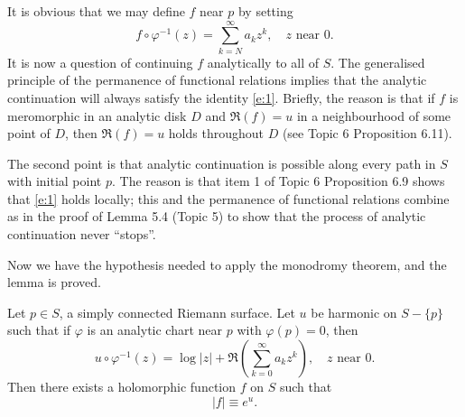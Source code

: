 \documentclass[a4paper,11pt]{article}
\begin{document}
\begin{myproof}
  It is obvious that we may define $f$ near $p$ by setting
  $$
  f \circ \varphi^{-1}(z) = \sum_{k=N}^{\infty} a_k z^k,\quad
  z \text{ near } 0.
  $$
  It is now a question of continuing $f$ analytically to all of $S$.
  The generalised principle of the permanence of functional relations
  implies that the analytic continuation will always satisfy the
  identity \eqref{e:1}.  Briefly, the reason is that if $f$ is
  meromorphic in an analytic disk $D$ and $\Re(f) = u$ in a
  neighbourhood of some point of $D$, then $\Re(f) = u$ holds
  throughout $D$ (see Topic 6 Proposition 6.11).

  The second point is that analytic continuation is possible along
  every path in $S$ with initial point $p$.  The reason is that
  item 1 of Topic 6 Proposition 6.9 shows that \eqref{e:1} holds
  locally; this and the permanence of functional relations combine as
  in the proof of Lemma 5.4 (Topic 5) to show that the process of
  analytic continuation never ``stops''.

  Now we have the hypothesis needed to apply the monodromy theorem,
  and the lemma is proved.
\end{myproof}

\begin{lem}
  \label{lem:2}
  Let $p \in S$, a simply connected Riemann surface.  Let $u$ be
  harmonic on $S - \{p\}$ such that if $\varphi$ is an analytic chart
  near $p$ with $\varphi(p) = 0$, then
  $$
  u \circ \varphi^{-1}(z) = \log|z| + \Re(\sum_{k=0}^{\infty} a_k
  z^k),
  \quad z\text{ near } 0.
  $$
  Then there exists a holomorphic function $f$ on $S$ such that
  \begin{equation}
    \label{e:2}
    |f| \equiv e^u.
  \end{equation}
\end{lem}
\end{document}
